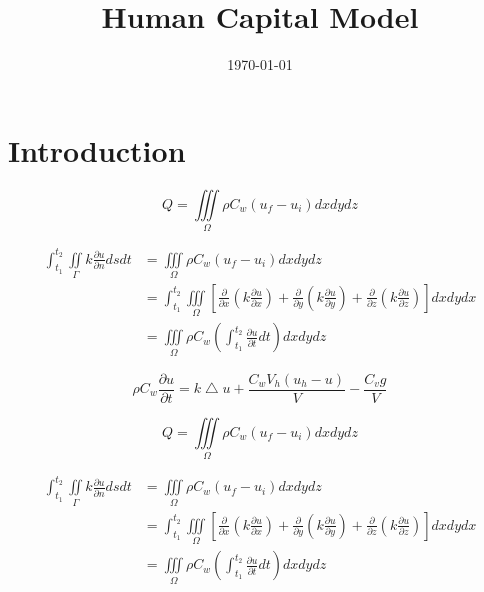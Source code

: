 \documentclass[12pt,a4paper,titlepage]{article}
\begin{document}
\title{Human Capital Model} \date{\today{}}
\maketitle

\tableofcontents

\newpage

\section{Introduction}
\label{sec:introduction}
\begin{displaymath}
Q=\iiint\limits_{\Omega}\rho C_{w}(u_f - u_i)dx dy dz
\end{displaymath}

\begin{displaymath}
\begin{aligned}
\int_{t_1}^{t_2} \iint\limits_{\Gamma}k\frac{\partial u}{\partial n}dsdt & =\iiint\limits_{\Omega}\rho C_{w}(u_f - u_i)dx dy dz\\
& =\int_{t_1}^{t_2}\iiint\limits_{\Omega}[\frac{\partial}{\partial x}(k\frac{\partial u}{\partial x})+\frac{\partial}{\partial y}(k\frac{\partial u}{\partial y})+\frac{\partial}{\partial z}(k\frac{\partial u}{\partial z})]dxdydx\\
& = \iiint\limits_{\Omega}\rho C_{w}(\int_{t_1}^{t_2}\frac{\partial u}{\partial t}dt)dxdydz
\end{aligned}
\end{displaymath}

\begin{displaymath}
\rho C_{w}\frac{\partial u}{\partial t}=k\bigtriangleup u+\frac{C_w V_h(u_h-u)}{V}-\frac{C_v g}{V}
\end{displaymath}


\begin{displaymath}
Q=\iiint\limits_{\Omega}\rho C_{w}(u_f - u_i)dx dy dz
\end{displaymath}

\begin{displaymath}
\begin{aligned}
\int_{t_1}^{t_2} \iint\limits_{\Gamma}k\frac{\partial u}{\partial n}dsdt & =\iiint\limits_{\Omega}\rho C_{w}(u_f - u_i)dx dy dz\\
& =\int_{t_1}^{t_2}\iiint\limits_{\Omega}[\frac{\partial}{\partial x}(k\frac{\partial u}{\partial x})+\frac{\partial}{\partial y}(k\frac{\partial u}{\partial y})+\frac{\partial}{\partial z}(k\frac{\partial u}{\partial z})]dxdydx\\
& = \iiint\limits_{\Omega}\rho C_{w}(\int_{t_1}^{t_2}\frac{\partial u}{\partial t}dt)dxdydz
\end{aligned}
\end{displaymath}
\end{document}
